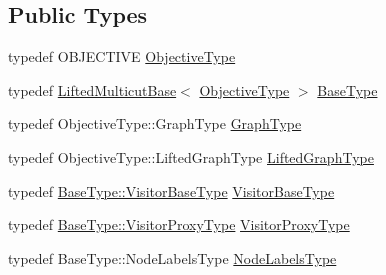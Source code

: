 \subsection*{Public Types}
\begin{DoxyCompactItemize}
\item 
typedef O\+B\+J\+E\+C\+T\+I\+V\+E \hyperlink{classnifty_1_1graph_1_1lifted__multicut_1_1LiftedMulticutKernighanLin_a7272520833b07efc1aa511a9733d3771}{Objective\+Type}
\item 
typedef \hyperlink{classnifty_1_1graph_1_1lifted__multicut_1_1LiftedMulticutBase}{Lifted\+Multicut\+Base}$<$ \hyperlink{classnifty_1_1graph_1_1lifted__multicut_1_1LiftedMulticutKernighanLin_a7272520833b07efc1aa511a9733d3771}{Objective\+Type} $>$ \hyperlink{classnifty_1_1graph_1_1lifted__multicut_1_1LiftedMulticutKernighanLin_afec8c523898626cc5759bf644e44263d}{Base\+Type}
\item 
typedef Objective\+Type\+::\+Graph\+Type \hyperlink{classnifty_1_1graph_1_1lifted__multicut_1_1LiftedMulticutKernighanLin_a6e0c46f755797db3090c482a20dbaf26}{Graph\+Type}
\item 
typedef Objective\+Type\+::\+Lifted\+Graph\+Type \hyperlink{classnifty_1_1graph_1_1lifted__multicut_1_1LiftedMulticutKernighanLin_aa840b160c70251de847aa878b01efe5c}{Lifted\+Graph\+Type}
\item 
typedef \hyperlink{classnifty_1_1graph_1_1optimization_1_1common_1_1SolverBase_a5a14d64c70a9cc0eebc7d71d2b089f9b}{Base\+Type\+::\+Visitor\+Base\+Type} \hyperlink{classnifty_1_1graph_1_1lifted__multicut_1_1LiftedMulticutKernighanLin_a857f9aef39b602be2db6657bf159b238}{Visitor\+Base\+Type}
\item 
typedef \hyperlink{classnifty_1_1graph_1_1optimization_1_1common_1_1SolverBase_a58913ea9ab9232ff72608b710c1012d0}{Base\+Type\+::\+Visitor\+Proxy\+Type} \hyperlink{classnifty_1_1graph_1_1lifted__multicut_1_1LiftedMulticutKernighanLin_abef495b6fbc0aace11c550698bf20788}{Visitor\+Proxy\+Type}
\item 
typedef Base\+Type\+::\+Node\+Labels\+Type \hyperlink{classnifty_1_1graph_1_1lifted__multicut_1_1LiftedMulticutKernighanLin_a454b79099051fd0044c227002191e7f6}{Node\+Labels\+Type}
\end{DoxyCompactItemize}
